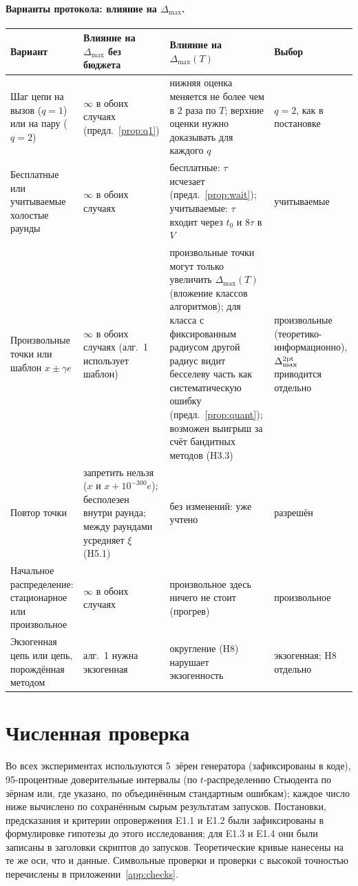 \documentclass[11pt,a4paper]{article}
\numberwithin{equation}{section}
\theoremstyle{definition}
\theoremstyle{remark}
\newcommand{\Dmax}{\Delta_{\max}}\newcommand{\Dcp}{\Delta_{\rm cp}}
\begin{document}
\paragraph{Варианты протокола: влияние на $\Dmax$.}
\begin{center}\small
\begin{tabularx}{\textwidth}{@{}>{\raggedright\arraybackslash}p{3.0cm}>{\raggedright\arraybackslash}p{3.6cm}>{\raggedright\arraybackslash}X>{\raggedright\arraybackslash}p{2.8cm}@{}}
\toprule
\textbf{Вариант} & \textbf{Влияние на $\Dmax$ без бюджета} & \textbf{Влияние на $\Dmax(T)$} & \textbf{Выбор}\\\midrule
Шаг цепи на вызов ($q=1$) или на пару ($q=2$) & $\infty$ в обоих случаях (предл.~\ref{prop:q1}) & нижняя оценка меняется не более чем в $2$ раза по $T$; верхние оценки нужно доказывать для каждого $q$ & $q=2$, как в постановке \\
Бесплатные или учитываемые холостые раунды & $\infty$ в обоих случаях & бесплатные: $\tau$ исчезает (предл.~\ref{prop:wait}); учитываемые: $\tau$ входит через $t_0$ и $8\tau$ в $V$ & учитываемые \\
Произвольные точки или шаблон $x\pm\gamma e$ & $\infty$ в обоих случаях (алг.~1 использует шаблон) & произвольные точки могут только увеличить $\Dmax(T)$ (вложение классов алгоритмов); для класса с фиксированным радиусом другой радиус видит бесселеву часть как систематическую ошибку (предл.~\ref{prop:quant}); возможен выигрыш за счёт бандитных методов (H3.3) & произвольные (теоретико-информационно), $\Dmax^{\rm 2pt}$ приводится отдельно \\
Повтор точки & запретить нельзя ($x$ и $x+10^{-300}e$); бесполезен внутри раунда; между раундами усредняет $\xi$ (H5.1) & без изменений: уже учтено & разрешён \\
Начальное распределение: стационарное или произвольное & $\infty$ в обоих случаях & произвольное здесь ничего не стоит (прогрев) & произвольное \\
Экзогенная цепь или цепь, порождённая методом & алг.~1 нужна экзогенная & округление (H8) нарушает экзогенность & экзогенная; H8 отдельно \\
\bottomrule
\end{tabularx}
\end{center}

\section{Численная проверка}\label{sec:num}
Во всех экспериментах используются 5~зёрен генератора (зафиксированы в коде), 95-процентные доверительные интервалы (по $t$-распределению Стьюдента по зёрнам или, где указано, по объединённым стандартным ошибкам); каждое число ниже вычислено по сохранённым сырым результатам запусков. Постановки, предсказания и критерии опровержения E1.1 и E1.2 были зафиксированы в формулировке гипотезы до этого исследования; для E1.3 и E1.4 они были записаны в заголовки скриптов до запусков. Теоретические кривые нанесены на те же оси, что и данные. Символьные проверки и проверки с высокой точностью перечислены в приложении~\ref{app:checks}.
\end{document}
